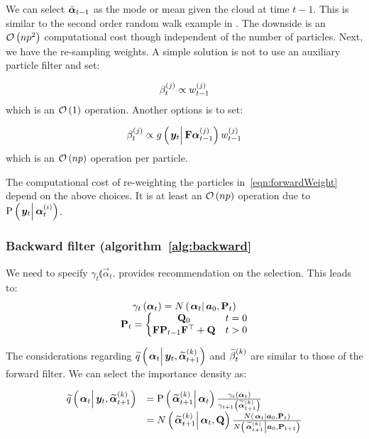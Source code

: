 %
%

We can select  $\bar{\bm{\alpha}}_{t - 1}$ as the mode or mean given the cloud at time $t-1$. This is similar to the second order random walk example in \cite{fearnhead10}. The downside is an $\mathcal{O}\left( np^2\right)$ computational cost though independent of the number of particles. Next, we have the re-sampling weights. A simple solution is not to use an auxiliary particle filter and set:

\begin{equation}
	\beta_{t}^{\left( j\right)} \propto w_{t-1}^{\left( j\right)}
\end{equation}
%
which is an $\mathcal{O}\left( 1\right)$ operation. Another options is to set:

\begin{equation}
	\partic{\beta}{t}{j} \propto  \optorC{g}{\vec{y}_t}{\mat{F}\partic{\vec{\alpha}}{t-1}{j}}\partic{w}{t-1}{j}
\end{equation}
%
%
which is an $\mathcal{O}\left( np\right)$ operation per particle.

The computational cost of re-weighting the particles in~\eqref{eqn:forwardWeight} depend on the above choices. It is at least an $\mathcal{O}\left( np\right)$ operation due to $\propC{\vec{y}_t}{\partic{\vec{\alpha}}{t}{i}}$.

\subsubsection*{Backward filter (algorithm~\ref{alg:backward}}
We need to specify $\gamma_t\Lparen{\vec{\alpha}_t}$. \citet[page 69 and 70]{briers10} provides recommendation on the selection. This leads to:
\begin{equation}\begin{matrix}
	\gamma_t\Lparen{\vec{\alpha}_t} =
		\normalC{\vec{\alpha}_t}{\vec{a}_0}{\mat{P}_t} \\
%
	\mat{P}_t = \left\{
		\begin{matrix} \mat{Q}_0 & t = 0 \\ \mat{F}\mat{P}_{t - 1}\mat{F}^\top + \mat{Q} & t > 0   \end{matrix} \right.
\end{matrix}\end{equation}

The considerations regarding $\IDAproxC{\vec{\alpha}_t}{\vec{y}_t, \particB{\vec{\alpha}}{t + 1}{k}}$ and $\widetilde{\beta}_{t}^{\left( k\right)}$ are similar to those of the forward filter. We can select the importance density as:

\begin{equation}\begin{array}{cl}
	\IDAproxC{\vec{\alpha}_t}{\vec{y}_t, \particB{\vec{\alpha}}{t + 1}{k}}  &= %
		\propC{\particB{\vec{\alpha}}{t + 1}{k}}{\vec{\alpha}_t}
		\frac{\gamma_t\Lparen{\vec{\alpha}_t}}{\gamma_{t + 1}\Lparen{\particB{\vec{\alpha}}{t + 1}{k}}} \\
	& = \normalC{\particB{\vec{\alpha}}{t + 1}{k}}{\vec{\alpha}_t}{\mat{Q}}
		\frac{
			\normalC{\vec{\alpha}_t}{\vec{a}_0}{\mat{P}_t}
		}{ %
			\normalC{\particB{\vec{\alpha}}{t + 1}{k}}{\vec{a}_0}{\mat{P}_{t + 1}}
		}
\end{array}\end{equation}

